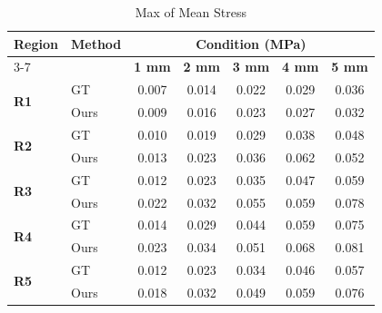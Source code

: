 \documentclass{article}
\begin{document}
\thispagestyle{empty}

\begin{table}[h]
\centering
\caption{Max of Mean Stress}
\vspace{0.3cm}
\begin{tabular}{llccccc}
\toprule
\textbf{Region} & \textbf{Method} & \multicolumn{5}{c}{\textbf{Condition (MPa)}} \\
\cmidrule(lr){3-7}
& & \textbf{1 mm} & \textbf{2 mm} & \textbf{3 mm} & \textbf{4 mm} & \textbf{5 mm} \\
\midrule
\multirow{2}{*}{\textbf{R1}} & GT  & 0.007 & 0.014 & 0.022 & 0.029 & 0.036 \\
 & Ours  & 0.009 & 0.016 & 0.023 & 0.027 & 0.032 \\ \midrule
\multirow{2}{*}{\textbf{R2}} & GT  & 0.010 & 0.019 & 0.029 & 0.038 & 0.048 \\
 & Ours  & 0.013 & 0.023 & 0.036 & 0.062 & 0.052 \\ \midrule
\multirow{2}{*}{\textbf{R3}} & GT  & 0.012 & 0.023 & 0.035 & 0.047 & 0.059 \\
 & Ours  & 0.022 & 0.032 & 0.055 & 0.059 & 0.078 \\ \midrule
\multirow{2}{*}{\textbf{R4}} & GT  & 0.014 & 0.029 & 0.044 & 0.059 & 0.075 \\
 & Ours  & 0.023 & 0.034 & 0.051 & 0.068 & 0.081 \\ \midrule
\multirow{2}{*}{\textbf{R5}} & GT  & 0.012 & 0.023 & 0.034 & 0.046 & 0.057 \\
 & Ours  & 0.018 & 0.032 & 0.049 & 0.059 & 0.076 \\
\bottomrule
\end{tabular}
\end{table}
\end{document}
